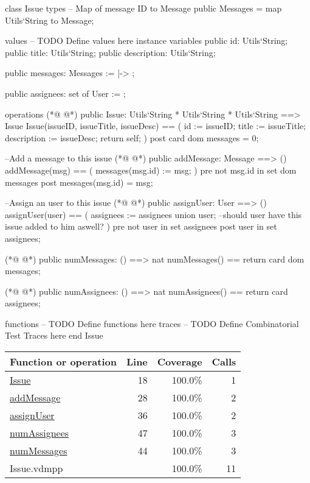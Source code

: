 \begin{vdmpp}[breaklines=true]
class Issue
types
 -- Map of message ID to Message
 public Messages = map Utils`String to Message;
 
values
-- TODO Define values here
instance variables
 public id: Utils`String;
 public title: Utils`String;
 public description: Utils`String;
 
 public messages: Messages := { |-> };
 
 public assignees: set of User := {};

operations
(*@
\label{Issue:18}
@*)
 public Issue: Utils`String * Utils`String * Utils`String ==> Issue
 Issue(issueID, issueTitle, issueDesc) == (
  id := issueID;
  title := issueTitle;
  description := issueDesc;
  return self;
 )
 post card dom messages = 0;
 
 --Add a message to this issue
(*@
\label{addMessage:28}
@*)
 public addMessage: Message ==> ()
 addMessage(msg) == (
  messages(msg.id) := msg;
 )
 pre not msg.id in set dom messages
 post messages(msg.id) = msg;
 
 --Assign an user to this issue
(*@
\label{assignUser:36}
@*)
 public assignUser: User ==> ()
 assignUser(user) == (
  assignees := assignees union {user};
  --should user have this issue added to him aswell?
 )
 pre not user in set assignees
 post user in set assignees;
 
(*@
\label{numMessages:44}
@*)
 public numMessages: () ==> nat
 numMessages() == return card dom messages;
 
(*@
\label{numAssignees:47}
@*)
 public numAssignees: () ==> nat
 numAssignees() == return card assignees;

functions
-- TODO Define functions here
traces
-- TODO Define Combinatorial Test Traces here
end Issue
\end{vdmpp}
\bigskip
\begin{longtable}{|l|r|r|r|}
\hline
Function or operation & Line & Coverage & Calls \\
\hline
\hline
\hyperref[Issue:18]{Issue} & 18&100.0\% & 1 \\
\hline
\hyperref[addMessage:28]{addMessage} & 28&100.0\% & 2 \\
\hline
\hyperref[assignUser:36]{assignUser} & 36&100.0\% & 2 \\
\hline
\hyperref[numAssignees:47]{numAssignees} & 47&100.0\% & 3 \\
\hline
\hyperref[numMessages:44]{numMessages} & 44&100.0\% & 3 \\
\hline
\hline
Issue.vdmpp & & 100.0\% & 11 \\
\hline
\end{longtable}

